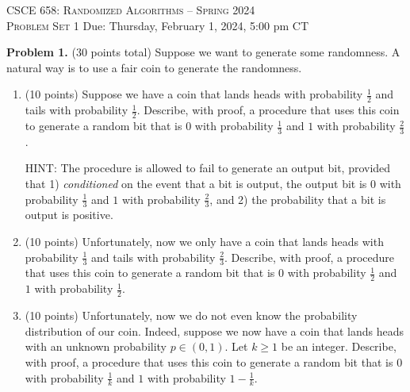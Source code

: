 \documentclass[11pt]{article}
\begin{document}
\begin{center}
{\Large\textsc{CSCE 658: Randomized Algorithms -- Spring 2024 \\ 
Problem Set 1}}
\vskip 0.1in
Due: Thursday, February 1, 2024, 5:00 pm CT
\end{center}
\textbf{Problem 1.} (30 points total)
Suppose we want to generate some randomness. 
A natural way is to use a fair coin to generate the randomness. 
\begin{enumerate}
\item (10 points)
Suppose we have a coin that lands heads with probability $\frac{1}{2}$ and tails with probability $\frac{1}{2}$. 
Describe, with proof, a procedure that uses this coin to generate a random bit that is $0$ with probability $\frac{1}{3}$ and $1$ with probability $\frac{2}{3}$.

\noindent
HINT: The procedure is allowed to fail to generate an output bit, provided that 1) \emph{conditioned} on the event that a bit is output, the output bit is $0$ with probability $\frac{1}{3}$ and $1$ with probability $\frac{2}{3}$, and 2) the probability that a bit is output is positive.  
\item (10 points)
Unfortunately, now we only have a coin that lands heads with probability $\frac{1}{3}$ and tails with probability $\frac{2}{3}$. 
Describe, with proof, a procedure that uses this coin to generate a random bit that is $0$ with probability $\frac{1}{2}$ and $1$ with probability $\frac{1}{2}$. 
\item (10 points)
Unfortunately, now we do not even know the probability distribution of our coin. 
Indeed, suppose we now have a coin that lands heads with an unknown probability $p\in(0,1)$. 
Let $k\ge 1$ be an integer. 
Describe, with proof, a procedure that uses this coin to generate a random bit that is $0$ with probability $\frac{1}{k}$ and $1$ with probability $1-\frac{1}{k}$. 
\end{enumerate}
\end{document}
